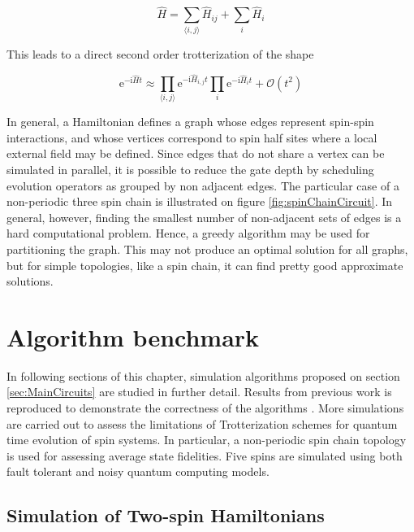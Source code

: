   \begin{equation}
    \hat{H} = \sum_{\langle i,j \rangle} \hat{H}_{ij} + \sum_i \hat{H}_i
  \end{equation}

  This leads to a direct second order trotterization of the shape

  \begin{equation}
    \mathrm{e}^{-\mathrm{i}\hat{H}t} \approx \prod_{\langle i,j \rangle} \mathrm{e}^{-\mathrm{i}\hat{H}_{i,j}t} \prod_{i} \mathrm{e}^{-\mathrm{i}\hat{H}_i t} + \mathcal{O}(t^2)
    \label{eq:HamiltonianTrotterization}
  \end{equation}

  In general, a Hamiltonian defines a graph whose edges represent spin-spin interactions, and whose vertices correspond to spin half sites where a local external field may be defined. Since edges that do not share a vertex can be simulated in parallel, it is possible to reduce the gate depth by scheduling evolution operators as grouped by non adjacent edges. The particular case of a non-periodic three spin chain is illustrated on figure \ref{fig:spinChainCircuit}. In general, however, finding the smallest number of non-adjacent sets of edges is a hard computational problem. Hence, a greedy algorithm may be used for partitioning the graph. This may not produce an optimal solution for all graphs, but for simple topologies, like a spin chain, it can find pretty good approximate solutions.

  

\section{Algorithm benchmark}
\label{sec:Benchmark}

  In following sections of this chapter, simulation algorithms proposed on section \ref{sec:MainCircuits} are studied in further detail. Results from previous work is reproduced to demonstrate the correctness of the algorithms \cite{HeisenbergSimulLasHeras, HubbardSimulLasHeras}. More simulations are carried out to assess the limitations of Trotterization schemes for quantum time evolution of spin systems. In particular, a non-periodic spin chain topology is used for assessing average state fidelities. Five spins are simulated using both fault tolerant and noisy quantum computing models.

  \subsection{Simulation of Two-spin Hamiltonians}

